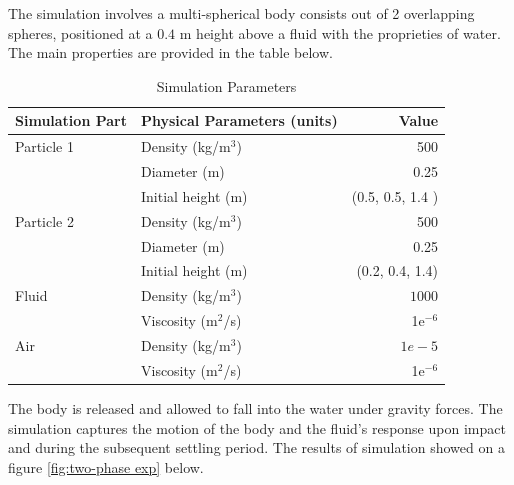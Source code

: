 The simulation involves a multi-spherical body consists out of 2 overlapping spheres, positioned at a $0.4$ m height above a fluid with the proprieties of water. The main properties are provided in the table below.
\begin{table}[ht]
    \centering
    \caption{Simulation Parameters} \label{table1-chap4}
    \begin{tabular}{llr}
        \toprule
        \hline
        Simulation Part         & Physical Parameters (units) & Value \\
        \hline
        \midrule
        Particle 1                & Density (kg/m$^3$)          & 500    \\
                         & Diameter (m)          & 0.25    \\
                         & Initial height (m)          & (0.5, 0.5, 1.4 )  \\
        Particle 2                & Density (kg/m$^3$)          & 500    \\
                         & Diameter (m)          & 0.25   \\
                         & Initial height (m)          &  (0.2, 0.4, 1.4)     \\
                         \hline
                                 Fluid                  & Density (kg/m$^3$)           & $1000$   \\
                                & Viscosity (m$^2$/s)         & 1e$^{-6}$    \\
                                \hline
         Air                  & Density (kg/m$^3$)           & $1e-5$   \\
                                & Viscosity (m$^2$/s)         & 1e$^{-6}$    \\
                                \hline
        \bottomrule
     \end{tabular}
\end{table}

The body is released and allowed to fall into the water under gravity forces. The simulation captures the motion of the body and the fluid's response upon impact and during the subsequent settling period. The results of simulation showed on a figure \ref{fig:two-phase exp} below.

